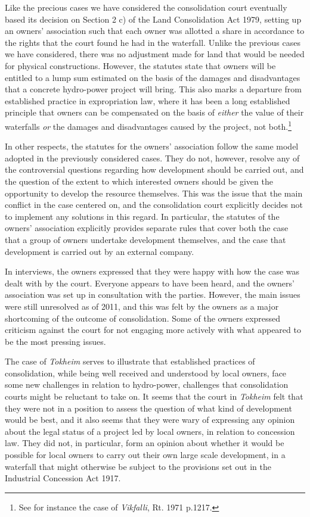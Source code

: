 \documentclass[10pt]{article} %
\begin{document}
Like the precious cases we have considered the consolidation court eventually based its decision on Section 2 c) of the Land Consolidation Act 1979, setting up an owners' association such that each owner was allotted a share in accordance to the rights that the court found he had in the waterfall. Unlike the previous cases we have considered, there was no adjustment made for land that would be needed for physical constructions. However, the statutes state that owners will be entitled to a lump sum estimated on the basis of the damages and disadvantages that a concrete hydro-power project will bring. This also marks a departure from established practice in expropriation law, where it has been a long established principle that owners can be compensated on the basis of \emph{either} the value of their waterfalls \emph{or} the damages and disadvantages caused by the project, not both.\footnote{See for instance the case of \emph{Vikfalli}, Rt. 1971 p.1217.} 

In other respects, the statutes for the owners' association follow the same model adopted in the previously considered cases. They do not, however, resolve any of the controversial questions regarding how development should be carried out, and the question of the extent to which interested owners should be given the opportunity to develop the resource themselves. This was the issue that the main conflict in the case centered on, and the consolidation court explicitly decides not to implement any solutions in this regard. In particular, the statutes of the owners' association explicitly provides separate rules that cover both the case that a group of owners undertake development themselves, and the case that development is carried out by an external company. 

In interviews, the owners expressed that they were happy with how the case was dealt with by the court. Everyone appears to have been heard, and the owners' association was set up in consultation with the parties. However, the main issues were still unresolved as of 2011, and this was felt by the owners as a major shortcoming of the outcome of consolidation. Some of the owners expressed criticism against the court for not engaging more actively with what appeared to be the most pressing issues.

The case of \emph{Tokheim} serves to illustrate that established practices of consolidation, while being well received and understood by local owners, face some new challenges in relation to hydro-power, challenges that consolidation courts might be reluctant to take on. It seems that the court in \emph{Tokheim} felt that they were not in a position to assess the question of what kind of development would be best, and it also seems that they were wary of expressing any opinion about the legal status of a project led by local owners, in relation to concession law. They did not, in particular, form an opinion about whether it would be possible for local owners to carry out their own large scale development, in a waterfall that might otherwise be subject to the provisions set out in the Industrial Concession Act 1917.
\end{document}
